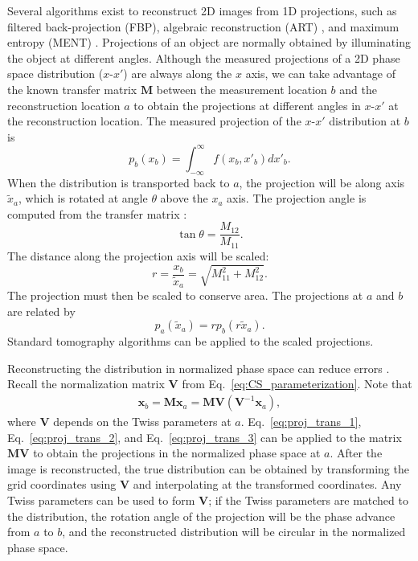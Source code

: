 Several algorithms exist to reconstruct 2D images from 1D projections, such as filtered back-projection (FBP), algebraic reconstruction (ART) \cite{Slaney1988}, and maximum entropy (MENT) \cite{Minerbo1979}. Projections of an object are normally obtained by illuminating the object at different angles. Although the measured projections of a 2D phase space distribution ($x$-$x'$) are always along the $x$ axis, we can take advantage of the known transfer matrix $\mathbf{M}$ between the measurement location $b$ and the reconstruction location $a$ to obtain the projections at different angles in $x$-$x'$ at the reconstruction location. The measured projection of the $x$-$x'$ distribution at $b$ is
%
\begin{equation}
    p_b(x_b) = \int_{-\infty}^{\infty} f(x_b, x'_b) dx'_b.
\end{equation}
%
When the distribution is transported back to $a$, the projection will be along axis $\tilde{x}_a$, which is rotated at angle $\theta$ above the $x_a$ axis. The projection angle is computed from the transfer matrix \cite{Hock2013a}:
%
\begin{equation}\label{eq:proj_trans_1}
    \tan\theta = \frac{M_{12}}{M_{11}}.
\end{equation}
%
The distance along the projection axis will be scaled:
%
\begin{equation}\label{eq:proj_trans_2}
    r = \frac{x_b}{\tilde{x}_a} = \sqrt{M_{11}^2 + M_{12}^2}.
\end{equation}
%
The projection must then be scaled to conserve area. The projections at $a$ and $b$ are related by 
%
\begin{equation}\label{eq:proj_trans_3}
    p_a(\tilde{x}_a) = r p_b(r \tilde{x}_a).
\end{equation}
%
Standard tomography algorithms can be applied to the scaled projections.

Reconstructing the distribution in normalized phase space can reduce errors \cite{Hock2011}. Recall the normalization matrix $\mathbf{V}$ from Eq.~\eqref{eq:CS_parameterization}. Note that
%
\begin{equation}
\begin{aligned}
    \mathbf{x}_b 
    = \mathbf{M} \mathbf{x}_a
    = \mathbf{M} \mathbf{V} (\mathbf{V}^{-1} \mathbf{x}_a)
    ,
\end{aligned}
\end{equation}
%
where $\mathbf{V}$ depends on the Twiss parameters at $a$. Eq.~\eqref{eq:proj_trans_1}, Eq.~\eqref{eq:proj_trans_2}, and Eq.~\eqref{eq:proj_trans_3} can be applied to the matrix $\mathbf{M} \mathbf{V}$ to obtain the projections in the normalized phase space at $a$. After the image is reconstructed, the true distribution can be obtained by transforming the grid coordinates using $\mathbf{V}$ and interpolating at the transformed coordinates. Any Twiss parameters can be used to form $\mathbf{V}$; if the Twiss parameters are matched to the distribution, the rotation angle of the projection will be the phase advance from $a$ to $b$, and the reconstructed distribution will be circular in the normalized phase space. 


